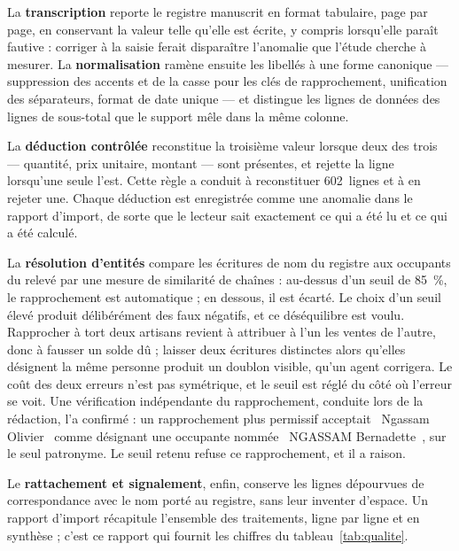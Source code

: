 La \textbf{transcription} reporte le registre manuscrit en format tabulaire, page par page, en conservant la valeur telle qu'elle est écrite, y compris lorsqu'elle paraît fautive : corriger à la saisie ferait disparaître l'anomalie que l'étude cherche à mesurer. La \textbf{normalisation} ramène ensuite les libellés à une forme canonique --- suppression des accents et de la casse pour les clés de rapprochement, unification des séparateurs, format de date unique --- et distingue les lignes de données des lignes de sous-total que le support mêle dans la même colonne.

La \textbf{déduction contrôlée} reconstitue la troisième valeur lorsque deux des trois --- quantité, prix unitaire, montant --- sont présentes, et rejette la ligne lorsqu'une seule l'est. Cette règle a conduit à reconstituer 602~lignes et à en rejeter une. Chaque déduction est enregistrée comme une anomalie dans le rapport d'import, de sorte que le lecteur sait exactement ce qui a été lu et ce qui a été calculé.

La \textbf{résolution d'entités} compare les écritures de nom du registre aux occupants du relevé par une mesure de similarité de chaînes : au-dessus d'un seuil de 85~\%, le rapprochement est automatique ; en dessous, il est écarté. Le choix d'un seuil élevé produit délibérément des faux négatifs, et ce déséquilibre est voulu. Rapprocher à tort deux artisans revient à attribuer à l'un les ventes de l'autre, donc à fausser un solde dû ; laisser deux écritures distinctes alors qu'elles désignent la même personne produit un doublon visible, qu'un agent corrigera. Le coût des deux erreurs n'est pas symétrique, et le seuil est réglé du côté où l'erreur se voit. Une vérification indépendante du rapprochement, conduite lors de la rédaction, l'a confirmé : un rapprochement plus permissif acceptait \guillemotleft~Ngassam Olivier~\guillemotright{} comme désignant une occupante nommée \guillemotleft~NGASSAM Bernadette~\guillemotright, sur le seul patronyme. Le seuil retenu refuse ce rapprochement, et il a raison.

Le \textbf{rattachement et signalement}, enfin, conserve les lignes dépourvues de correspondance avec le nom porté au registre, sans leur inventer d'espace. Un rapport d'import récapitule l'ensemble des traitements, ligne par ligne et en synthèse ; c'est ce rapport qui fournit les chiffres du tableau~\ref{tab:qualite}.


